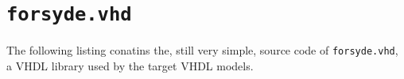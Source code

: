 \section{\texttt{forsyde.vhd}}
The following listing conatins the, still very simple, source code of
\texttt{forsyde.vhd}, a VHDL library used by the target VHDL
models.  


